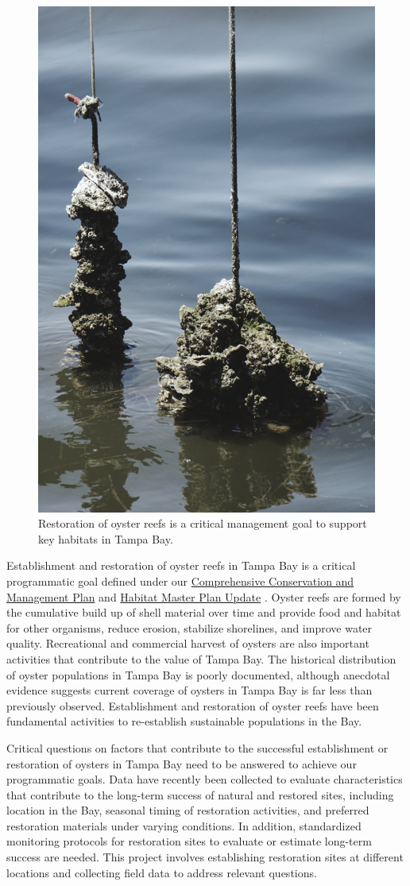 \documentclass[
]{book}
\begin{document}
\begin{figure}

{\centering \includegraphics[width=0.5\linewidth]{img/oysters} 

}

\caption{Restoration of oyster reefs is a critical management goal to support key habitats in Tampa Bay.}\label{fig:unnamed-chunk-11}
\end{figure}

Establishment and restoration of oyster reefs in Tampa Bay is a critical programmatic goal defined under our \href{https://indd.adobe.com/view/cf7b3c48-d2b2-4713-921c-c2a0d4466632}{Comprehensive Conservation and Management Plan} \citep{tbep1017} and \href{https://drive.google.com/file/d/1Hp0l_qtbxp1JxKJoGatdyuANSzQrpL0I/view}{Habitat Master Plan Update} \citep{tbep0720}. Oyster reefs are formed by the cumulative build up of shell material over time and provide food and habitat for other organisms, reduce erosion, stabilize shorelines, and improve water quality. Recreational and commercial harvest of oysters are also important activities that contribute to the value of Tampa Bay. The historical distribution of oyster populations in Tampa Bay is poorly documented, although anecdotal evidence suggests current coverage of oysters in Tampa Bay is far less than previously observed. Establishment and restoration of oyster reefs have been fundamental activities to re-establish sustainable populations in the Bay.

Critical questions on factors that contribute to the successful establishment or restoration of oysters in Tampa Bay need to be answered to achieve our programmatic goals. Data have recently been collected to evaluate characteristics that contribute to the long-term success of natural and restored sites, including location in the Bay, seasonal timing of restoration activities, and preferred restoration materials under varying conditions. In addition, standardized monitoring protocols for restoration sites to evaluate or estimate long-term success are needed. This project involves establishing restoration sites at different locations and collecting field data to address relevant questions.
\end{document}
